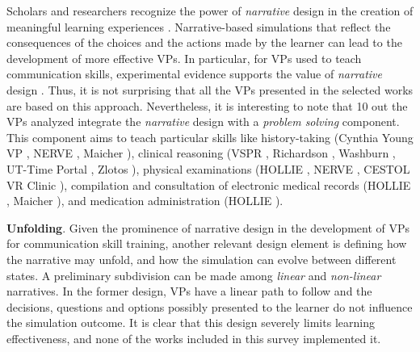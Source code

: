 Scholars and researchers recognize the power of \emph{narrative} design in the creation of meaningful learning experiences \cite{bearman2001random,marei2018use}.
Narrative-based simulations that reflect the consequences of the choices and the actions made by the learner can lead to the development of more effective VPs.  In particular, for VPs used to teach communication skills, experimental  evidence supports the value of \emph{narrative} design \cite{bearman2001random}. Thus, it is not surprising that all the VPs presented in the selected works are based on this approach. Nevertheless, it is interesting to note that 10 out the \totalVPs VPs analyzed integrate the \emph{narrative} design with a \emph{problem solving} component. 
This component aims to teach particular skills like history-taking (Cynthia Young VP \cite{foster2016using}, NERVE \cite{hirumi2016advancingPart2,hirumi2016advancing,kleinsmith2015understanding}, Maicher \cite{maicher2017developing}), clinical reasoning (VSPR \cite{peddle2019exploring,peddle2019development}, Richardson \cite{richardson2019virtual},  Washburn \cite{washburn2020virtual}, UT-Time Portal \cite{zielke2016beyond,zielke2016using}, Zlotos \cite{zlotos2016scenario}),  physical examinations (HOLLIE \cite{adefila2020students}, NERVE \cite{hirumi2016advancingPart2,hirumi2016advancing,kleinsmith2015understanding},  CESTOL VR Clinic \cite{sapkaroski2018implementation}), compilation and consultation of electronic medical records (HOLLIE \cite{adefila2020students}, Maicher \cite{maicher2017developing}), and medication administration (HOLLIE \cite{adefila2020students}). 





\textbf{Unfolding}. Given the prominence of narrative design in the development of VPs for communication skill training, another relevant design element is defining how the narrative may unfold, and how the simulation can evolve between different states. A preliminary subdivision can be made among \textit{linear} and \textit{non-linear} narratives. In the former design, VPs have a linear path to follow and the decisions, questions and options possibly presented to the learner do not influence the simulation outcome. It is clear that this design severely limits learning effectiveness, and none of the works included in this survey implemented it.

